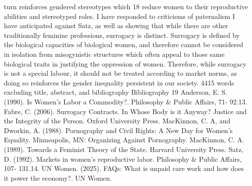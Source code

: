 turn reinforces gendered stereotypes which 18 reduce women to their
reproductive abilities and stereotyped roles. I have responded to
criticisms of paternalism I have anticipated against Satz, as well as
showing that while there are other traditionally feminine professions,
surrogacy is distinct. Surrogacy is defined by the biological capacities
of biological women, and therefore cannot be considered in isolation
from misogynistic structures which often appeal to those same biological
traits in justifying the oppression of women. Therefore, while surrogacy
is not a special labour, it should not be treated according to market
norms, as doing so reinforces the gender inequality persistent in our
society. 4415 words excluding title, abstract, and bibliography
Bibliography 19 Anderson, E. S. (1990). Is Women's Labor a Commodity?.
Philosophy \& Public Affairs, 71- 92.13. Fabre, C. (2006). Surrogacy
Contracts. In Whose Body is it Anyway? Justice and the Integrity of the
Person. Oxford University Press. MacKinnon, C. A, and Dworkin, A.
(1988). Pornography and Civil Rights: A New Day for Women's Equality.
Minneapolis, MN: Organizing Against Pornography. MacKinnon, C. A.
(1989). Towards a Feminist Theory of the State. Harvard University
Press. Satz, D. (1992). Markets in women's reproductive labor.
Philosophy \& Public Affairs, 107- 131.14. UN Women. (2025). FAQs: What
is unpaid care work and how does it power the economy?. UN Women.
